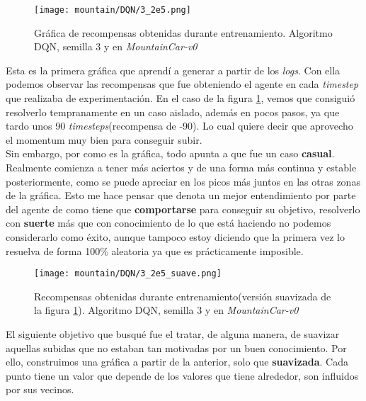 \documentclass[11pt,fleqn]{book} %
\begin{document}
\begin{figure}[H]
	\centering\texttt{[image: mountain/DQN/3\_2e5.png]}
	\caption{Gráfica de recompensas obtenidas durante entrenamiento. Algoritmo DQN, semilla 3 y en \textit{MountainCar-v0}}
	\label{fig:mountain1} %
\end{figure}

Esta es la primera gráfica que aprendí a generar a partir de los \textit{logs}. Con ella podemos observar las recompensas que fue obteniendo el agente en cada \textit{timestep} que realizaba de experimentación. En el caso de la figura \ref{fig:mountain1}, vemos que consiguió resolverlo tempranamente en un caso aislado, además en pocos pasos, ya que tardo unos 90 \textit{timesteps}(recompensa de -90). Lo cual quiere decir que aprovecho el momentum muy bien para conseguir subir. \\

Sin embargo, por como es la gráfica, todo apunta a que fue un caso \textbf{casual}. Realmente comienza a tener más aciertos y de una forma más continua y estable posteriormente, como se puede apreciar en los picos más juntos en las otras zonas de la gráfica. Esto me hace pensar que denota un mejor entendimiento por parte del agente de como tiene que \textbf{comportarse} para conseguir su objetivo, resolverlo con \textbf{suerte} más que con conocimiento de lo que está haciendo no podemos considerarlo como éxito, aunque tampoco estoy diciendo que la primera vez lo resuelva de forma 100\% aleatoria ya que es prácticamente imposible.

\begin{figure}[H]
	\centering\texttt{[image: mountain/DQN/3\_2e5\_suave.png]}
	\caption{Recompensas obtenidas durante entrenamiento(versión suavizada de la figura \ref{fig:mountain1}). Algoritmo DQN, semilla 3 y en \textit{MountainCar-v0}}
	\label{fig:mountain2} %
\end{figure}

El siguiente objetivo que busqué fue el tratar, de alguna manera, de suavizar aquellas subidas que no estaban tan motivadas por un buen conocimiento. Por ello, construimos una gráfica a partir de la anterior, solo que \textbf{suavizada}. Cada punto tiene un valor que depende de los valores que tiene alrededor, son influidos por sus vecinos. \\
\end{document}
